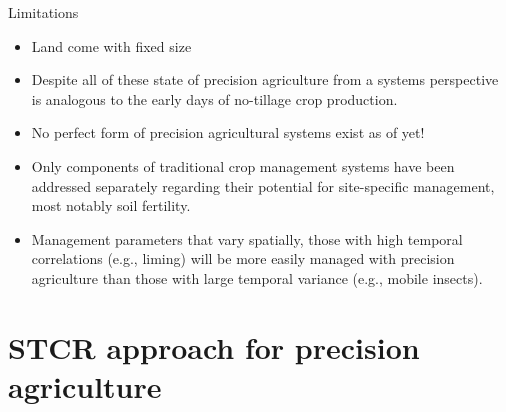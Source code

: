 \documentclass[11pt,dvipsnames,ignorenonframetext,aspectratio=169]{beamer}
\providecommand{\tightlist}{%
  \setlength{\itemsep}{0pt}\setlength{\parskip}{0pt}}
\begin{document}
\begin{frame}{Limitations}
\protect\hypertarget{limitations}{}
\begin{itemize}
\tightlist
\item
  Land come with fixed size
\item
  Despite all of these state of precision agriculture from a systems
  perspective is analogous to the early days of no-tillage crop
  production.
\item
  No perfect form of precision agricultural systems exist as of yet!
\item
  Only components of traditional crop management systems have been
  addressed separately regarding their potential for site-specific
  management, most notably soil fertility.
\item
  Management parameters that vary spatially, those with high temporal
  correlations (e.g., liming) will be more easily managed with precision
  agriculture than those with large temporal variance (e.g., mobile
  insects).
\end{itemize}
\end{frame}

\hypertarget{stcr-approach-for-precision-agriculture}{%
\section{STCR approach for precision
agriculture}\label{stcr-approach-for-precision-agriculture}}
\end{document}
